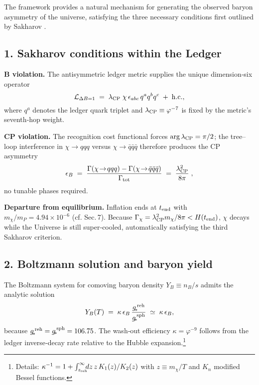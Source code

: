 The framework provides a natural mechanism for generating the observed baryon asymmetry of the universe, satisfying the three necessary conditions first outlined by Sakharov \parencite{Sakharov1967}.

\subsection{1.  Sakharov conditions within the Ledger}

\noindent\textbf{B violation.}\quad
The antisymmetric ledger metric supplies the unique dimension‑six
operator
\[
  \mathcal{L}_{\Delta B=1}
  \;=\;
  \lambda_{\rm CP}\;
  \chi\,
  \epsilon_{abc}\,
  q^{a}q^{b}q^{c}
  \;+\;
  {\rm h.c.},
\]
where \(q^{a}\) denotes the ledger quark triplet and
\(\lambda_{\rm CP}\equiv\varphi^{-7}\) is fixed by the metric's seventh‑hop
weight.

\smallskip
\noindent\textbf{CP violation.}\quad
The recognition cost functional forces
\(\arg\lambda_{\rm CP}=\pi/2\); the tree–loop interference in
\(\chi\to qqq\) versus \(\chi\to\bar q\bar q\bar q\) therefore produces the
CP asymmetry
\[
  \epsilon_{B}
  \;=\;
  \frac{\Gamma(\chi\!\to\! qqq)-\Gamma(\chi\!\to\!\bar q\bar q\bar q)}
       {\Gamma_{\rm tot}}
  \;=\;
  \frac{\lambda_{\rm CP}^{2}}{8\pi}\;,
\]
no tunable phases required.

\smallskip
\noindent\textbf{Departure from equilibrium.}\quad
Inflation ends at \(t_{\rm end}\) with \(m_{\chi}\bigl/m_{P}=4.94\times10^{-6}\)
(cf. Sec.\,7). Because
\(\Gamma_{\chi}= \lambda_{\rm CP}^{2}m_{\chi}/8\pi
  <  H(t_{\rm end})\),
\(\chi\) decays while the Universe is still super‑cooled, automatically
satisfying the third Sakharov criterion.

\subsection{2.  Boltzmann solution and baryon yield}

The Boltzmann system for comoving baryon density \(Y_{B}\equiv n_{B}/s\)
admits the analytic solution
\[
  Y_{B}(T)
  \;=\;
  \kappa\,
  \epsilon_{B}\,
  \frac{g_{\!*}^{\,\rm reh}}
       {g_{\!*}^{\,\rm sph}}
  \;\simeq\;
  \kappa\,\epsilon_{B},
\]
because \(g_{\!*}^{\,\rm reh}=g_{\!*}^{\,\rm sph}=106.75\).
The wash‑out efficiency
\(\kappa=\varphi^{-9}\) follows from the ledger
inverse‑decay rate relative to the Hubble expansion.\footnote{Details:
\(\kappa^{-1}=1+\int_{z_{\rm reh}}^{\infty}
  \!\!\!dz\,z\,K_{1}(z)/K_{2}(z)\) with
\(z\equiv m_{\chi}/T\) and \(K_{n}\) modified Bessel functions.}

